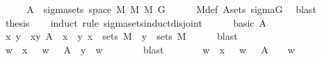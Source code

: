 \begin{isabellebody}
\ \ \isamarkupfalse%
\ \isamarkupfalse%
\ {\isachardoublequoteopen}A\ {\isasymin}\ sigma{\isacharunderscore}{\kern0pt}sets\ {\isacharparenleft}{\kern0pt}space\ {\isacharparenleft}{\kern0pt}M{}\ {\isasymOtimes}\isactrlsub M\ M{}{\isacharparenright}{\kern0pt}{\isacharparenright}{\kern0pt}\ {\isacharquery}{\kern0pt}G{\isachardoublequoteclose}\isanewline
\ \ \ \ \isamarkupfalse%
\ M{}{\isacharunderscore}{\kern0pt}def\ A{\isacharunderscore}{\kern0pt}sets\ sigma{\isacharunderscore}{\kern0pt}G\ \isamarkupfalse%
\ blast\isanewline
\ \ \isamarkupfalse%
\ \isamarkupfalse%
\ {\isacharquery}{\kern0pt}thesis\isanewline
\ \ \isamarkupfalse%
\ {\isacharparenleft}{\kern0pt}induct\ rule{\isacharcolon}{\kern0pt}\ sigma{\isacharunderscore}{\kern0pt}sets{\isacharunderscore}{\kern0pt}induct{\isacharunderscore}{\kern0pt}disjoint{\isacharparenright}{\kern0pt}\isanewline
\ \ \ \ \isamarkupfalse%
\ {\isacharparenleft}{\kern0pt}basic\ A{\isacharparenright}{\kern0pt}\isanewline
\ \ \ \ \isamarkupfalse%
\ \isamarkupfalse%
\ x\ y\ \ xy{\isacharcolon}{\kern0pt}\ {\isachardoublequoteopen}A\ {\isacharequal}{\kern0pt}\ x\ {\isasymtimes}\ y{\isachardoublequoteclose}\ {\isachardoublequoteopen}x\ {\isasymin}\ sets\ M{}{\isachardoublequoteclose}\ \ {\isachardoublequoteopen}y\ {\isasymin}\ sets\ M{}{\isachardoublequoteclose}\isanewline
\ \ \ \ \isamarkupfalse%
\ blast\isanewline
\ \ \ \ \isamarkupfalse%
\ \isamarkupfalse%
\ {\isachardoublequoteopen}w\ {\isasymin}\ x\ {\isasymLongrightarrow}\ {\isacharbraceleft}{\kern0pt}{\isasymomega}\ {\isacharparenleft}{\kern0pt}w{\isacharcomma}{\kern0pt}\ {\isasymomega}\ {\isasymin}\ A{\isacharbraceright}{\kern0pt}\ {\isacharequal}{\kern0pt}\ y{\isachardoublequoteclose}\ \ w\isanewline
\ \ \ \ \ \ \isamarkupfalse%
\ blast\isanewline
\ \ \ \ \isamarkupfalse%
\ \isamarkupfalse%
\ {\isachardoublequoteopen}w\ {\isasymnotin}\ x\ {\isasymLongrightarrow}\ {\isacharbraceleft}{\kern0pt}{\isasymomega}\ {\isacharparenleft}{\kern0pt}w{\isacharcomma}{\kern0pt}\ {\isasymomega}\ {\isasymin}\ A{\isacharbraceright}{\kern0pt}\ {\isacharequal}{\kern0pt}\ {\isacharbraceleft}{\kern0pt}{\isacharbraceright}{\kern0pt}{\isachardoublequoteclose}\ \ w\isanewline

\end{isabellebody}
